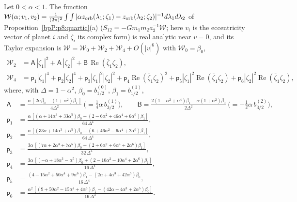 \begin{proposition}\label{bpP:p11b:pair-jet}
Let $0<\alpha<1$. The function $\mathcal W(\alpha;v_1,v_2)=\frac1{(2\pi)^2}\int\int|\alpha z_{\rm orb}(\lambda_1;\zeta_1)-z_{\rm orb}(\lambda_2;\zeta_2)|^{-1}d\lambda_1d\lambda_2$ of Proposition~\ref{bpP:p8:quartic}(a) ($S_{12}=-Gm_1m_2a_2^{-1}\mathcal W$; here $v_i$ is the eccentricity vector of planet $i$ and $\zeta_i$ its complex form) is real analytic near $v=0$, and its Taylor expansion is $\mathcal W=\mathcal W_0+\mathcal W_2+\mathcal W_4+O(|v|^6)$ with $\mathcal W_0=\beta_0$,
\begin{align*}
\mathcal W_2&=\mathsf A\,|\zeta_1|^2+\mathsf A\,|\zeta_2|^2+\mathsf B\,\operatorname{Re}(\bar\zeta_1\zeta_2),\\
\mathcal W_4&=\mathsf p_1|\zeta_1|^4+\mathsf p_2|\zeta_2|^4+\mathsf p_3|\zeta_1|^2|\zeta_2|^2+\mathsf p_4\operatorname{Re}(\bar\zeta_1\zeta_2)^2+\mathsf p_5|\zeta_1|^2\operatorname{Re}(\bar\zeta_1\zeta_2)+\mathsf p_6|\zeta_2|^2\operatorname{Re}(\bar\zeta_1\zeta_2),
\end{align*}
where, with $\Delta=1-\alpha^2$, $\beta_0=b_{1/2}^{(0)}$, $\beta_1=b_{1/2}^{(1)}$,
\begin{align*}
\mathsf A&=\frac{\alpha\,[\,2\alpha\beta_0-(1+\alpha^2)\beta_1\,]}{4\Delta^2}\ \Big(=\tfrac14\alpha\,b_{3/2}^{(1)}\Big),\qquad
\mathsf B=\frac{2(1-\alpha^2+\alpha^4)\beta_1-\alpha(1+\alpha^2)\beta_0}{2\Delta^2}\ \Big(=-\tfrac12\alpha\,b_{3/2}^{(2)}\Big),\\
\mathsf p_1&=\frac{\alpha\,[(\alpha+14\alpha^3+33\alpha^5)\beta_0-(2-6\alpha^2+46\alpha^4+6\alpha^6)\beta_1]}{64\,\Delta^4},\\
\mathsf p_2&=\frac{\alpha\,[(33\alpha+14\alpha^3+\alpha^5)\beta_0-(6+46\alpha^2-6\alpha^4+2\alpha^6)\beta_1]}{64\,\Delta^4},\\
\mathsf p_3&=\frac{3\alpha\,[(7\alpha+2\alpha^3+7\alpha^5)\beta_0-(2+6\alpha^2+6\alpha^4+2\alpha^6)\beta_1]}{32\,\Delta^4},\\
\mathsf p_4&=\frac{3\alpha\,[(-\alpha+18\alpha^3-\alpha^5)\beta_0+(2-10\alpha^2-10\alpha^4+2\alpha^6)\beta_1]}{16\,\Delta^4},\\
\mathsf p_5&=\frac{(4-15\alpha^2+50\alpha^4+9\alpha^6)\beta_1-(2\alpha+4\alpha^3+42\alpha^5)\beta_0}{16\,\Delta^4},\\
\mathsf p_6&=\frac{\alpha^2\,[(9+50\alpha^2-15\alpha^4+4\alpha^6)\beta_1-(42\alpha+4\alpha^3+2\alpha^5)\beta_0]}{16\,\Delta^4}.
\end{align*}

\end{proposition}
